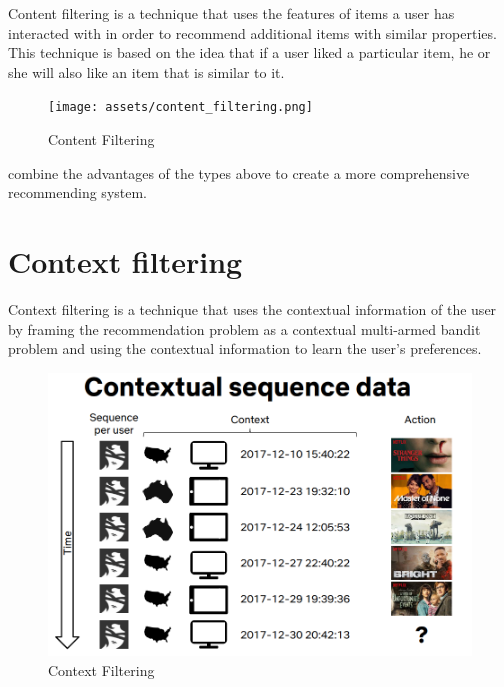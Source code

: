 \label{subsec:content-filtering}
Content filtering is a technique that uses the features of items a user has interacted with in order to recommend additional items with similar properties. This technique is based on the idea that if a user liked a particular item, he or she will also like an item that is similar to it. 
\begin{figure}[htbp]
    \centering
    \texttt{[image: assets/content\_filtering.png]}
    \caption{Content Filtering}
    \label{fig:content-filtering}
\end{figure}

\label{subsec:hybrid-recommendation-systems}
combine the advantages of the types above to create a more comprehensive recommending system.

\section{Context filtering}\label{sec:context-filtering}
Context filtering is a technique that uses the contextual information of the user by framing the recommendation problem as a contextual multi-armed bandit problem and using the contextual information to learn the user's preferences.
\begin{figure}
    \centering
    \includegraphics[width=\textwidth]{assets/contextual-sequence-prediction.png}
    \caption{Context Filtering}
    \label{fig:costextual-filtering}
\end{figure}